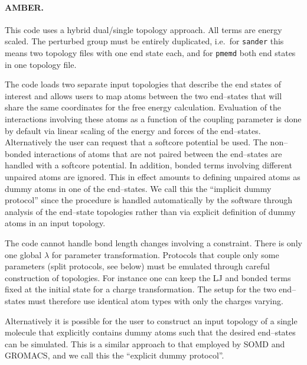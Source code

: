 \documentclass[journal=jctcce,manuscript=article]{achemso}
\newcommand{\progname}[1]{\texttt{#1}}
\begin{document}
\paragraph{AMBER.}
This code uses a hybrid dual/single topology approach.  All terms are energy scaled.
The perturbed group must be entirely duplicated, i.e.\ for
\progname{sander} this means two topology files with one end state each, and for \progname{pmemd} both end states in one topology file.

The code loads two separate input topologies that describe the end
states of interest and allows users to map atoms between the two
end--states that will share the same coordinates for the free energy
calculation.  Evaluation of the interactions involving these atoms as
a function of the coupling parameter is done by default via linear
scaling of the energy and forces of the end--states.  Alternatively
the user can request that a softcore potential be used.  The
non--bonded interactions of atoms that are not paired between the
end--states are handled with a softcore potential.  In addition,
bonded terms involving different unpaired atoms are ignored.  This in
effect amounts to defining unpaired atoms as dummy atoms in one of the
end--states.  We call this the ``implicit dummy protocol'' since the
procedure is handled automatically by the software through analysis of
the end--state topologies rather than via explicit definition of dummy
atoms in an input topology.

The code cannot handle bond length changes involving a constraint.
There is only one global $\lambda$ for parameter transformation.
Protocols that couple only some parameters (split protocols, see
below) must be emulated through careful construction of topologies.  For instance one can keep the LJ and bonded terms fixed at the initial state for a charge transformation.  The setup for
the two end--states must therefore use identical atom types with only the charges varying.

Alternatively it is possible for the user to construct an input
topology of a single molecule that explicitly contains dummy atoms
such that the desired end--states can be simulated.  This is a similar approach to that employed by SOMD and GROMACS, and we call this the ``explicit dummy protocol''.

\end{document}
